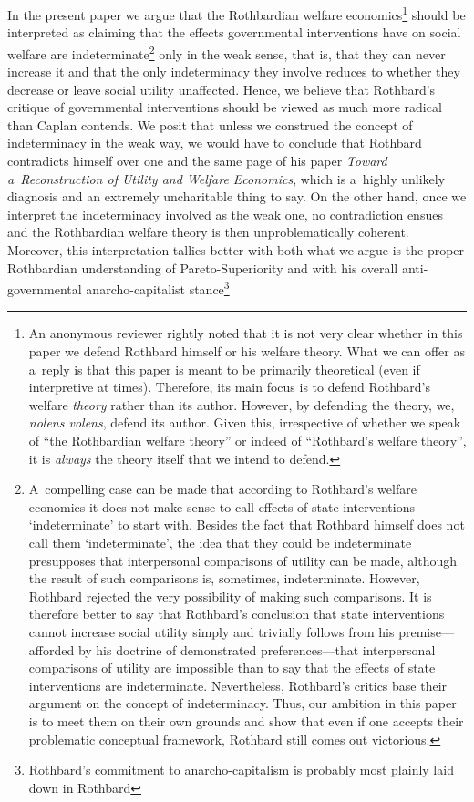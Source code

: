 In the present paper we argue that the Rothbardian welfare economics\footnote{An anonymous reviewer rightly noted that it is not very clear whether in this paper we defend Rothbard himself or his welfare theory. What we can offer as a~reply is that this paper is meant to be primarily theoretical (even if interpretive at times). Therefore, its main focus is to defend Rothbard's welfare \textit{theory} rather than its author. However, by defending the theory, we, \textit{nolens volens}, defend its author. Given this, irrespective of whether we speak of ``the Rothbardian welfare theory'' or indeed of ``Rothbard's welfare theory'', it is \textit{always} the theory itself that we intend to defend. } should be interpreted as claiming that the effects governmental interventions have on social welfare are indeterminate\footnote{A~compelling case can be made that according to Rothbard's welfare economics it does not make sense to call effects of state interventions ‘indeterminate' to start with. Besides the fact that Rothbard himself does not call them ‘indeterminate', the idea that they could be indeterminate presupposes that interpersonal comparisons of utility can be made, although the result of such comparisons is, sometimes, indeterminate. However, Rothbard rejected the very possibility of making such comparisons. It is therefore better to say that Rothbard's conclusion that state interventions cannot increase social utility simply and trivially follows from his premise---afforded by his doctrine of demonstrated preferences---that interpersonal comparisons of utility are impossible than to say that the effects of state interventions are indeterminate. Nevertheless, Rothbard's critics base their argument on the concept of indeterminacy. Thus, our ambition in this paper is to meet them on their own grounds and show that even if one accepts their problematic conceptual framework, Rothbard still comes out victorious.} only in the weak sense, that is, that they can never increase it and that the only indeterminacy they involve reduces to whether they decrease or leave social utility unaffected. Hence, we believe that Rothbard's critique of governmental interventions should be viewed as much more radical than Caplan contends. We posit that unless we construed the concept of indeterminacy in the weak way, we would have to conclude that Rothbard contradicts himself over one and the same page of his paper \textit{Toward a~Reconstruction of Utility and Welfare Economics}, which is a~highly unlikely diagnosis and an extremely uncharitable thing to say. On the other hand, once we interpret the indeterminacy involved as the weak one, no contradiction ensues and the Rothbardian welfare theory is then unproblematically coherent. Moreover, this interpretation tallies better with both what we argue is the proper Rothbardian understanding of Pareto-Superiority and with his overall anti-governmental anarcho-capitalist stance\footnote{Rothbard's commitment to anarcho-capitalism is probably most plainly laid down in Rothbard 
}
